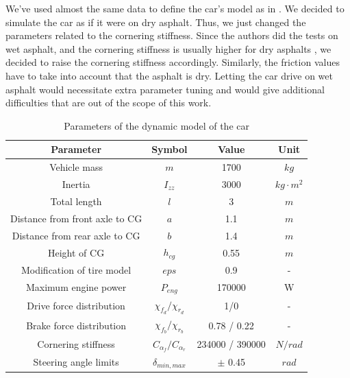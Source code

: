 \documentclass[a4paper, onecolumn, 12pt]{article}
\begin{document}
We've used almost the same data to define the car's model as in \cite{paper}. We
decided to simulate the car as if it were on dry asphalt. Thus, we just changed
the parameters related to the cornering stiffness. Since the authors did the
tests on wet asphalt, and the cornering stiffness is usually higher for dry
asphalts \cite{stiffness}, we decided to raise the cornering stiffness
accordingly. Similarly, the friction values have to take into account that the
asphalt is dry. Letting the car drive on wet asphalt would necessitate extra
parameter tuning and would give additional difficulties that are out of the
scope of this work.
\begin{table}[H]
    \centering
    \caption{Parameters of the dynamic model of the car} \label{params}
    \begin{tabular}{ |c|c|c|c| }
        \hline
        \textbf{Parameter} & \textbf{Symbol} & \textbf{Value} & \textbf{Unit} \\ [0.5ex] 
        \hline
        \hline 
        Vehicle mass & $m$ & 1700 & $kg$\\ 
        \hline
        Inertia & $I_{zz}$ & 3000 & $kg \cdot m^2$\\
        \hline
        Total length & $l$ & 3 & $m$\\
        \hline
        Distance from front axle to CG & $a$ & 1.1 & $m$\\
        \hline
        Distance from rear axle to CG & $b$ & 1.4 & $m$\\
        \hline
        Height of CG & $h_{cg}$ & 0.55 & $m$\\
        \hline
        Modification of tire model & $eps$ & 0.9 & -\\
        \hline
        Maximum engine power & $P_{eng}$ & 170000 & W \\
        \hline
        Drive force distribution & $\chi_{f_d} / \chi_{r_d}$ & 1/0 & -\\
        \hline
        Brake force distribution & $\chi_{f_b} / \chi_{r_b}$ & 0.78 / 0.22 & -\\
        \hline
        Cornering stiffness & $C_{\alpha_f} / C_{\alpha_r}$ & 234000 / 390000 & $N/rad$\\
        \hline
        Steering angle limits & $\delta_{min,max}$ & $\pm$ 0.45 & $rad$ \\
        \hline

    \end{tabular}
\end{table}
\end{document}
